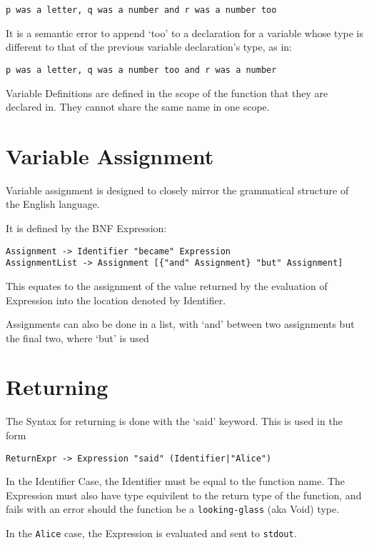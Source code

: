 \documentclass[a4wide, 11pt]{article}
\begin{document}
\begin{verbatim}
p was a letter, q was a number and r was a number too
\end{verbatim}

It is a semantic error to append `too' to a declaration for a variable whose type is different to that of the previous variable declaration's type, as in:

\begin{verbatim}
p was a letter, q was a number too and r was a number
\end{verbatim}

Variable Definitions are defined in the scope of the function that they are declared in. They cannot share the same name in one scope.

\section{Variable Assignment}

Variable assignment is designed to closely mirror the grammatical structure of the English language.

It is defined by the BNF Expression:

\begin{verbatim}
Assignment -> Identifier "became" Expression
AssignmentList -> Assignment [{"and" Assignment} "but" Assignment]
\end{verbatim}

This equates to the assignment of the value returned by the evaluation of Expression into the location denoted by Identifier.

Assignments can also be done in a list, with `and' between two assignments but the final two, where `but' is used

\section {Returning}

The Syntax for returning is done with the `said' keyword. This is used in the form
\begin{verbatim}
ReturnExpr -> Expression "said" (Identifier|"Alice")
\end{verbatim}
In the Identifier Case, the Identifier must be equal to the function name. The Expression must also have type equivilent to the return type of the function, and fails with an error should the function be a \texttt{looking-glass} (aka Void) type.

In the \texttt{Alice} case, the Expression is evaluated and sent to \texttt{stdout}.
\end{document}
